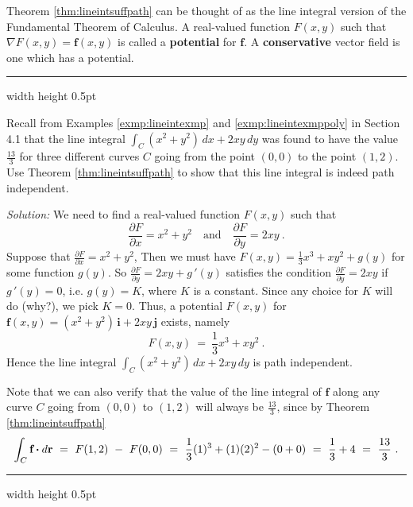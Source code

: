 Theorem \ref{thm:lineintsuffpath} can be thought of as the line integral version of the Fundamental Theorem of
Calculus. A real-valued function $F(x,y)$ such that $\nabla F(x,y) = \mathbf{f}(x,y)$ is called a \textbf{potential} for $\mathbf{f}$. 
A \textbf{conservative} vector field is one which has a potential.

\medskip
\hrule width \textwidth height 0.5pt
\begin{exmp}\label{exmp:lineintexmpclosed}
 Recall from Examples \ref{exmp:lineintexmp}  and \ref{exmp:lineintexmppoly} in Section 4.1 that the line
 integral $\int_C (x^2 + y^2 )\,dx + 2xy\,dy$ was found to have the value $\frac{13}{3}$ for three different curves $C$
 going from the point $(0,0)$ to the point $(1,2)$. Use Theorem \ref{thm:lineintsuffpath} to show that this line
 integral is indeed path independent.\smallskip
 \par\noindent \emph{Solution:} We need to find a real-valued function $F(x,y)$ such that
 \begin{displaymath}
  \frac{\partial F}{\partial x} = x^2 + y^2 \quad\text{and}\quad \frac{\partial F}{\partial y} =  2xy ~.
 \end{displaymath}
 Suppose that $\frac{\partial F}{\partial x} = x^2 + y^2$, Then we must have $F(x,y) = \frac{1}{3}x^3 + xy^2 + g(y)$ for
 some function $g(y)$. So $\frac{\partial F}{\partial y} = 2xy + g\,'(y)$
 satisfies the condition $\frac{\partial F}{\partial y} = 2xy$ if $g\,'(y)=0$, i.e. $g(y)=K$, where $K$ is a
 constant. Since any choice for $K$ will do (why?), we pick $K=0$. Thus, a potential $F(x,y)$ for 
 $\mathbf{f}(x,y) = ( x^2 + y^2 )\,\mathbf{i} + 2xy\,\mathbf{j}$ exists, namely
 \begin{displaymath}
  F(x,y) ~=~ \frac{1}{3}x^3 + xy^2 ~.
 \end{displaymath}
 Hence the line integral $\int_C (x^2 + y^2 )\,dx + 2xy\,dy$ is path independent.
 
 \par\noindent Note that we can also verify that the value of the line integral of $\mathbf{f}$ along any curve $C$ going
 from $(0,0)$ to $(1,2)$ will always be $\frac{13}{3}$, since by Theorem \ref{thm:lineintsuffpath}
 \begin{displaymath}
  \int_{C} \textbf{f} \bm{\cdot} d\textbf{r} ~=~ F(1,2) ~-~ F(0,0) ~=~ \frac{1}{3}(1)^3 + (1)(2)^2 - (0+0) ~=~ \frac{1}{3} + 4 ~=~ \frac{13}{3} ~.
 \end{displaymath}
\end{exmp}
\hrule width \textwidth height 0.5pt
\medskip

